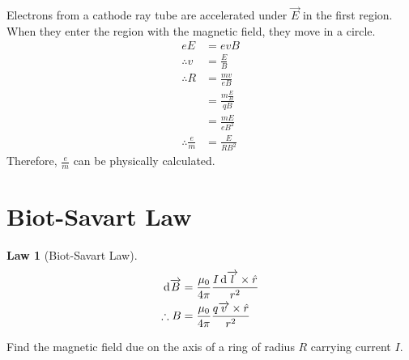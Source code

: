 \documentclass[fleqn, a4paper, 12pt, twoside]{article}
\theoremstyle{definition}
\theoremstyle{theorem}
\newtheorem{law}{Law}
\begin{document}
Electrons from a cathode ray tube are accelerated under $\overrightarrow{E}$ in the first region.
When they enter the region with the magnetic field, they move in a circle.
\begin{align*}
	e E                    & = e v B                     \\
	\therefore v           & = \frac{E}{B}               \\
	\therefore R           & = \frac{m v}{e B}           \\
                               & = \frac{m \frac{E}{B}}{q B} \\
                               & = \frac{m E}{e B^2}         \\
	\therefore \frac{e}{m} & = \frac{E}{R B^2}
\end{align*}
Therefore, $\frac{e}{m}$ can be physically calculated.

\section{Biot-Savart Law}

\begin{law}[Biot-Savart Law]
	\begin{align*}
		\dif \overrightarrow{B} & = \frac{\mu_0}{4 \pi} \frac{I \dif \overrightarrow{l} \times \hat{r}}{r^2} \\
		\therefore B            & = \frac{\mu_0}{4 \pi} \frac{q \overrightarrow{v} \times \hat{r}}{r^2}
	\end{align*}
	\label{Biot-Savart_Law}
\end{law}

\begin{question}
	Find the magnetic field due on the axis of a ring of radius $R$ carrying current $I$.
	\begin{figure}[H]
	\end{figure}
\end{question}
\end{document}

